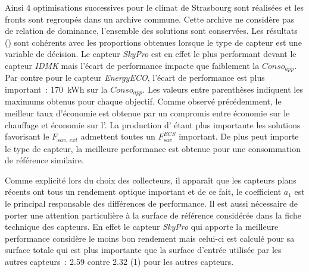 Ainsi \num{4} optimisations successives pour le climat de Strasbourg sont réalisées
et les fronts sont regroupés dans un archive commune.
Cette archive ne considère pas de relation de dominance, l’ensemble des solutions sont
conservées. Les résultats () sont cohérents avec les
proportions obtenues lorsque le type de capteur est une variable de décision. Le capteur
\textit{SkyPro} est en effet le plus performant devant le capteur \textit{IDMK} mais
l’écart de performance impacte que faiblement la $Conso_{app}$. Par contre pour le capteur \textit{EnergyECO},
l’écart de performance est plus important~: \SI{170}{kWh} sur la $Conso_{app}$.
Les valeurs entre parenthèses indiquent les maximums obtenus pour chaque objectif.
Comme observé précédemment, le meilleur taux d’économie est obtenue par un compromis
entre économie sur le chauffage et économie sur l’. La production d’ étant
plus importante les solutions favorisant le $F_{sav,\, ext}$ admettent toutes
un $F_{sav}^{ECS}$ important. De plus peut importe le type de capteur, la
meilleure performance est obtenue pour une consommation de référence similaire.

Comme explicité lors du choix des collecteurs, il apparaît que les capteurs plans récents
ont tous un rendement optique important et de ce fait, le coefficient $a_{1}$ est
le principal responsable des différences de performance. Il est aussi nécessaire
de porter une attention particulière à la surface de référence considérée dans la
fiche technique des capteurs. En effet le capteur \textit{SkyPro} qui apporte la
meilleure performance considère le moins bon rendement mais celui-ci est calculé
pour sa surface totale qui est plus importante que la surface d’entrée utilisée
par les autres capteurs~: \num{2.59} contre \num{2.32 (1)} pour les autres capteurs.

